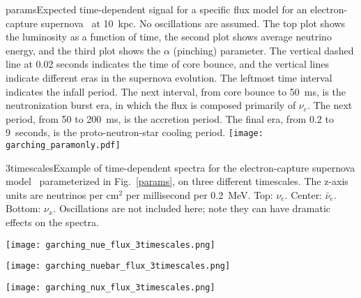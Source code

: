 \begin{dunefigure}{params}{Expected
  time-dependent signal for a specific flux model for an
  electron-capture supernova~\cite{Huedepohl:2009wh} at 10~kpc.  No oscillations are assumed. The
  top plot shows the luminosity as a function of time, the second plot
  shows average neutrino energy, and the third plot shows the $\alpha$
  (pinching) parameter.  The vertical dashed line at 0.02 seconds indicates
  the time of core bounce, and the vertical lines indicate different
  eras in the supernova evolution.  The leftmost time interval
  indicates the infall period.  The next interval, from core bounce to
  50~ms, is the neutronization burst era, in which the flux is
  composed primarily of $\nu_e$.  The next period, from 50 to 200~ms,
  is the accretion period. The final era, from 0.2 to 9~seconds, is
  the proto-neutron-star cooling period.}
\texttt{[image: garching\_paramonly.pdf]}
\end{dunefigure}

\begin{dunefigure}{3timescales}{Example of time-dependent spectra for the electron-capture supernova model~\cite{Huedepohl:2009wh} parameterized in Fig.~\ref{params}, on three different timescales.   The z-axis units are neutrinos per cm$^2$ per millisecond per 0.2~MeV.  Top: $\nu_e$.  Center: $\bar{\nu}_e$.  Bottom: $\nu_x$.  Oscillations are not included here; note they can have dramatic effects on the spectra.}
\centerline{\texttt{[image: garching\_nue\_flux\_3timescales.png]}}
\centerline{\texttt{[image: garching\_nuebar\_flux\_3timescales.png]}}
\centerline{\texttt{[image: garching\_nux\_flux\_3timescales.png]}}
\end{dunefigure}





